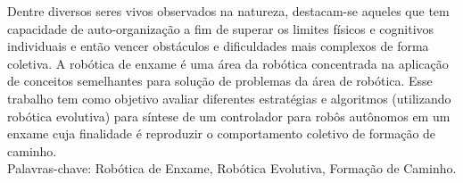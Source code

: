 Dentre diversos seres vivos observados na natureza, destacam-se aqueles que tem capacidade de auto-organização a fim de superar os limites físicos e cognitivos individuais e então vencer obstáculos e dificuldades mais complexos de forma coletiva. A robótica de enxame é uma área da robótica concentrada na aplicação de conceitos semelhantes para solução de problemas da área de robótica. Esse trabalho tem como objetivo avaliar diferentes estratégias e algoritmos (utilizando robótica evolutiva) para síntese de um controlador para robôs autônomos em um enxame cuja finalidade é reproduzir o comportamento coletivo de formação de caminho.\\

\noindent
Palavras-chave: Robótica de Enxame, Robótica Evolutiva, Formação de Caminho.